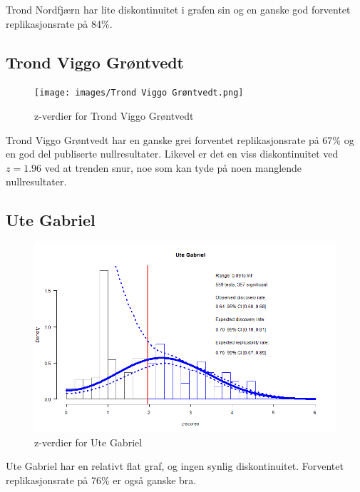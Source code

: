 \documentclass[doc,norsk]{apa7}
\begin{document}
Trond Nordfjærn har lite diskontinuitet i grafen sin og en ganske god forventet replikasjonsrate på 84\%.

\subsection{Trond Viggo Grøntvedt}
\begin{figure}[h!]
    \centering
    \texttt{[image: images/Trond Viggo Grøntvedt.png]}
    \caption{z-verdier for Trond Viggo Grøntvedt}
\end{figure}

Trond Viggo Grøntvedt har en ganske grei forventet replikasjonsrate på 67\% og en god del publiserte nullresultater. Likevel er det en viss diskontinuitet ved $z=1.96$ ved at trenden snur, noe som kan tyde på noen manglende nullresultater.

\subsection{Ute Gabriel}
\begin{figure}[h!]
    \centering
    \includegraphics[width=\textwidth]{images/Ute Gabriel.png}
    \caption{z-verdier for Ute Gabriel}
\end{figure}

Ute Gabriel har en relativt flat graf, og ingen synlig diskontinuitet. Forventet replikasjonsrate på 76\% er også ganske bra.
\end{document}

